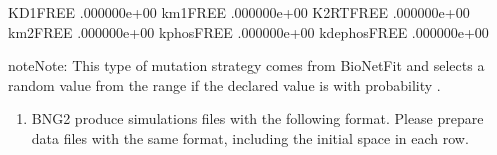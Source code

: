 \documentclass[letterpaper,10pt,english]{sphinxmanual}
\begin{document}
%
\begin{sphinxVerbatim}[commandchars=\\\{\}]
KD1\PYGZus{}\PYGZus{}FREE\PYGZus{}\PYGZus{}        .000000e+00 
km1\PYGZus{}\PYGZus{}FREE\PYGZus{}\PYGZus{}        .000000e+00 
K2RT\PYGZus{}\PYGZus{}FREE\PYGZus{}\PYGZus{}       .000000e+00 
km2\PYGZus{}\PYGZus{}FREE\PYGZus{}\PYGZus{}        .000000e+00 
kphos\PYGZus{}\PYGZus{}FREE\PYGZus{}\PYGZus{}      .000000e+00 
kdephos\PYGZus{}\PYGZus{}FREE\PYGZus{}\PYGZus{}    .000000e+00 
\end{sphinxVerbatim}

\begin{sphinxadmonition}{note}{Note:}
 This type of mutation strategy comes from BioNetFit and
selects a random value from the range 
if the declared value is  with probability .
\end{sphinxadmonition}
\begin{enumerate}
\def\theenumi{\arabic{enumi}}
\def\labelenumi{\theenumi .}
\makeatletter\def\p@enumii{\p@enumi \theenumi .}\makeatother
\setcounter{enumi}{1}
\item {} 

BNG2 produce simulations files with the following format. Please prepare
data files with the same format, including the initial space in each row.

\end{enumerate}
\end{document}
